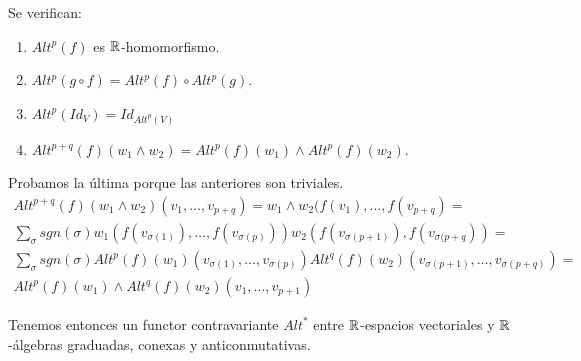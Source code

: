 \documentclass[CV.tex]{subfiles}
\begin{document}
\begin{dem}
\begin{propi}
Se verifican:
\begin{enumerate}
\item $Alt^p(f)$ es $\mathbb{R}$-homomorfismo.
\item $Alt^p(g\circ f)=Alt^p(f)\circ Alt^p(g)$.
\item $Alt^p(Id_V)=Id_{Alt^p(V)}$
\item $Alt^{p+q}(f)(w_1\land w_2)=Alt^p(f)(w_1)\land Alt^p(f)(w_2)$. 
\end{enumerate}
\end{propi}
\begin{dem}
Probamos la última porque las anteriores son triviales.
\begin{gather*}
Alt^{p+q}(f)(w_1\land w_2)(v_1,\dots, v_{p+q})=w_1\land w_2(f(v_1),\dots, f(v_{p+q})=\\
\sum_{\sigma}sgn(\sigma)w_1(f(v_{\sigma(1)}),\dots, f(v_{\sigma(p)}))w_2(f(v_{\sigma(p+1)}),f(v_{\sigma(p+q}))=\\
\sum_{\sigma}sgn(\sigma) Alt^p(f)(w_1)(v_{\sigma(1)},\dots, v_{\sigma(p)})Alt^q(f)(w_2)(v_{\sigma(p+1)},\dots, v_{\sigma(p+q)})=\\
Alt^p(f)(w_1)\land Alt^q(f)(w_2)(v_1,\dots, v_{p+1})
\end{gather*}
\QED
\end{dem}

Tenemos entonces un functor contravariante $Alt^*$ entre $\mathbb{R}$-espacios vectoriales y $\mathbb{R}$-álgebras graduadas, conexas y anticonmutativas.


\end{dem}
\end{document}
